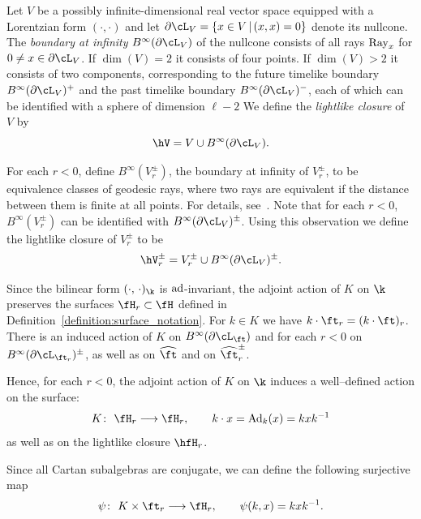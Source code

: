 \begin{Definition}\label{definition:lightlike_closure}  Let $V$ be a possibly infinite-dimensional real vector space equipped with a Lorentzian form $(\cdot, \cdot)$ and let
$\partial\cL_V = \{x\in V\, |\, (x,x)=0\}$ denote its nullcone. The {\em boundary at infinity} $B^\infty(\partial\cL_V)$ of the nullcone consists of all rays ${\rm Ray}_x$ for $0\neq x\in\partial\cL_V$. If $\dim(V)=2$ it consists of four points. If $\dim(V)>2$ it consists of two components, corresponding to the future timelike boundary $B^\infty(\partial\cL_V)^+$ and the past timelike boundary $B^\infty(\partial\cL_V)^-$, each of which can be identified with a sphere of dimension $\ell-2$ We define the {\em lightlike closure} of~$V$ by
\[\hV = V\cup B^\infty(\partial\cL_V).\]
\end{Definition}

For each $r<0$, define $B^\infty(V_r^\pm)$, the boundary at infinity of $V_r^\pm$, to be equivalence classes of geodesic rays, where two rays are equivalent if the distance between them is finite at all points. For details, see~\cite{Eberlein96}. Note that for each $r<0$,
$B^\infty(V_r^\pm)$ can be identified with $B^\infty(\partial\cL_V)^\pm$. Using this observation we define the lightlike closure of
$V_r^\pm$ to be
\begin{equation}
\hV_r^\pm= V_r^\pm\cup B^\infty(\partial\cL_V)^\pm.
\end{equation}

Since the bilinear form $(\cdot,\, \cdot)_{\k}$ is ${\rm ad}$-invariant, the adjoint action of $K$ on $\k$ preserves the surfaces $\fH_r\subset \fH$ defined in Definition~\ref{definition:surface_notation}.
For $k\in K$ we have $k\cdot \ft_r=(k\cdot \ft)_r$. There is an induced action of $K$ on $B^\infty(\partial\cL_\ft)$ and for each $r<0$ on
$B^\infty(\partial\cL_{\ft_r})^\pm$, as well as on ${\widehat \ft}$ and on ${\widehat \ft}_r^\pm$.

Hence, for each $r<0$, the adjoint action of $K$ on $\k$ induces a well--defined action on the surface:
\[K\colon \ \fH_{r}\longrightarrow \fH_{r},\qquad k\cdot x = {\rm Ad}_k(x) = kxk^{-1}\]
as well as on the lightlike closure $\hfH_r$.

Since all Cartan subalgebras are conjugate, we can define the following surjective map
\begin{displaymath}
\psi\colon \ K\times \ft_{r}\longrightarrow \fH_{r},\qquad \psi(k,x) = kxk^{-1}.
\end{displaymath}


